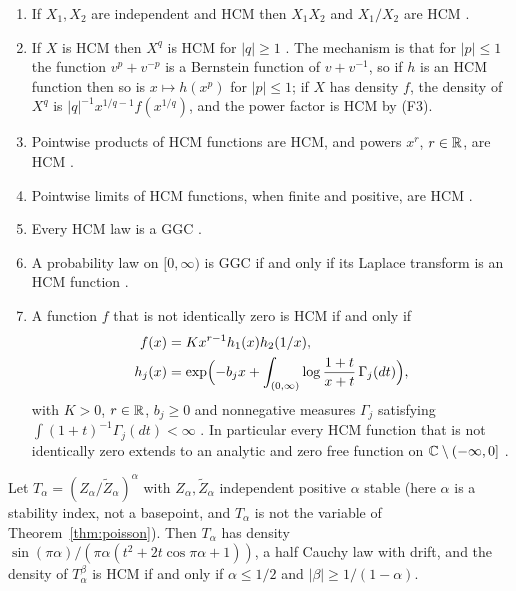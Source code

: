 \begin{enumerate}
\item[(F1)] If $X_1,X_2$ are independent and HCM then $X_1X_2$ and $X_1/X_2$ are HCM \cite[Theorem 5.1.1]{Bondesson}.
\item[(F2)] If $X$ is HCM then $X^q$ is HCM for $|q|\ge 1$ \cite[pp.~68 and 69]{Bondesson}. The mechanism is that for $|p|\le 1$ the function $v^p+v^{-p}$ is a Bernstein function of $v+v^{-1}$, so if $h$ is an HCM function then so is $x\mapsto h(x^p)$ for $|p|\le 1$; if $X$ has density $f$, the density of $X^q$ is $|q|^{-1}x^{1/q-1}f(x^{1/q})$, and the power factor is HCM by (F3).
\item[(F3)] Pointwise products of HCM functions are HCM, and powers $x^{r}$, $r\in\mathbb{R}$, are HCM \cite[p.~68]{Bondesson}.
\item[(F4)] Pointwise limits of HCM functions, when finite and positive, are HCM \cite[p.~68 and Theorem 5.1.3]{Bondesson}.
\item[(F5)] Every HCM law is a GGC \cite[Theorem 5.1.2]{Bondesson}.
\item[(F6)] A probability law on $[0,\infty)$ is GGC if and only if its Laplace transform is an HCM function \cite[Theorem 6.1.1]{Bondesson}.
\item[(F7)] A function $f$ that is not identically zero is HCM if and only if
\begin{equation}\label{bs:eq:bond}
\begin{aligned}
f(x)&=Kx^{r-1}h_1(x)h_2(1/x),\\
h_j(x)&=\exp\Bigl(-b_jx+\int_{(0,\infty)}\log\frac{1+t}{x+t}\,\Gamma_j(dt)\Bigr),
\end{aligned}
\end{equation}
with $K>0$, $r\in\mathbb{R}$, $b_j\ge0$ and nonnegative measures $\Gamma_j$ satisfying $\int(1+t)^{-1}\Gamma_j(dt)<\infty$ \cite[(5.2.3) and Theorem 5.3.1]{Bondesson}. In particular every HCM function that is not identically zero extends to an analytic and zero free function on $\mathbb{C}\setminus(-\infty,0]$ \cite[p.~68]{Bondesson}.
\end{enumerate}

\begin{theorem}
Let $T_\alpha=(Z_\alpha/\tilde Z_\alpha)^\alpha$ with $Z_\alpha,\tilde Z_\alpha$ independent positive $\alpha$ stable (here $\alpha$ is a stability index, not a basepoint, and $T_\alpha$ is not the variable of Theorem~\ref{thm:poisson}). Then $T_\alpha$ has density $\sin(\pi\alpha)/(\pi\alpha(t^2+2t\cos\pi\alpha+1))$, a half Cauchy law with drift, and the density of $T_\alpha^\beta$ is HCM if and only if $\alpha\le1/2$ and $|\beta|\ge 1/(1-\alpha)$.
\end{theorem}

